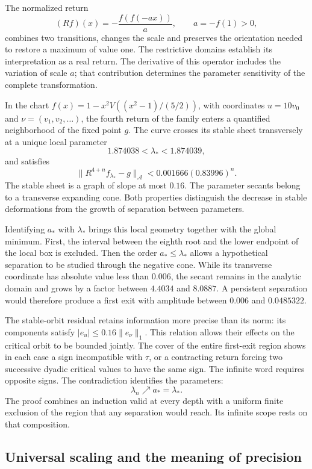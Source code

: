 The normalized return
\[
(Rf)(x)=-\frac{f(f(-ax))}{a},\qquad a=-f(1)>0,
\]
combines two transitions, changes the scale and preserves the orientation needed
to restore a maximum of value one. The restrictive domains establish
its interpretation as a real return. The derivative of this operator includes
the variation of scale \(a\); that contribution determines the parameter
sensitivity of the complete transformation.

In the chart \(f(x)=1-x^2V((x^2-1)/(5/2))\), with coordinates \(u=10v_0\)
and \(\nu=(v_1,v_2,\ldots)\), the fourth return of the family enters a
quantified neighborhood of the fixed point \(g\). The curve crosses
its stable sheet transversely at a unique local parameter
\[
1.874038<\lambda_*<1.874039,
\]
and satisfies
\[
\|R^{4+n}f_{\lambda_*}-g\|_{\mathcal A}
<0.001666(0.83996)^n.
\]
The stable sheet is a graph of slope at most \(0.16\). The
parameter secants belong to a transverse expanding cone. Both
properties distinguish the decrease in stable deformations from the
growth of separation between parameters.

Identifying \(a_*\) with \(\lambda_*\) brings this local geometry together
with the global minimum. First, the interval between the eighth root
and the lower endpoint of the local box is excluded. Then the order
\(a_*\le\lambda_*\) allows a hypothetical separation to be studied through
the negative cone. While its transverse coordinate has absolute value less
than \(0.006\), the secant remains in the analytic domain and grows by a
factor between \(4.4034\) and \(8.0887\). A persistent separation
would therefore produce a first exit with amplitude between
\(0.006\) and \(0.0485322\).

The stable-orbit residual retains information more precise than its
norm: its components satisfy \(|e_u|\le0.16\|e_\nu\|_1\). This
relation allows their effects on the critical orbit to be bounded jointly.
The cover of the entire first-exit region shows in each case a
sign incompatible with \(\tau\), or a contracting return forcing two
successive dyadic critical values to have the same sign. The infinite
word requires opposite signs. The contradiction identifies the parameters:
\[
\lambda_n\nearrow a_*=\lambda_*.
\]
The proof combines an induction valid at every depth with a
uniform finite exclusion of the region that any separation
would reach. Its infinite scope rests on that composition.

\subsection{Universal scaling and the meaning of precision}

